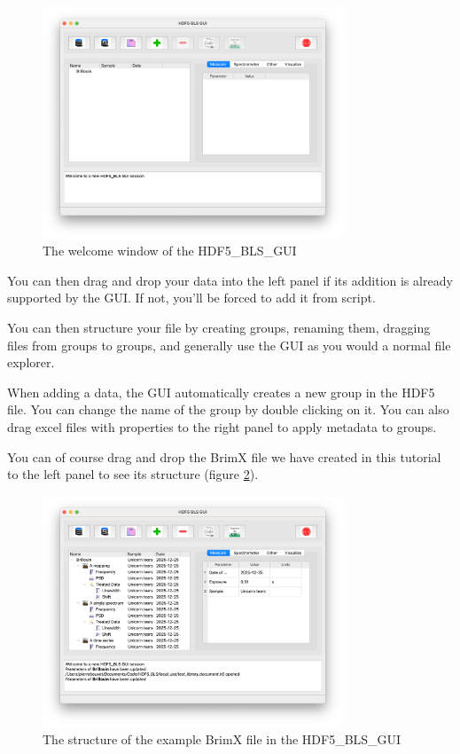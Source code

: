 \documentclass{article}
\begin{document}
\begin{figure}[H]
    \centering
    \includegraphics[width=0.8\textwidth]{img/HDF5_BLS_GUI_welcome.png}
    \caption{The welcome window of the HDF5\_BLS\_GUI}
    \label{fig:gui_main_window}
\end{figure}

You can then drag and drop your data into the left panel if its addition is already supported by the GUI. If not, you'll be forced to add it from script. 

You can then structure your file by creating groups, renaming them, dragging files from groups to groups, and generally use the GUI as you would a normal file explorer.

When adding a data, the GUI automatically creates a new group in the HDF5 file. You can change the name of the group by double clicking on it. You can also drag excel files with properties to the right panel to apply metadata to groups.

You can of course drag and drop the BrimX file we have created in this tutorial to the left panel to see its structure (figure \ref{fig:brimx_structure}).

\begin{figure}[H]
    \centering
    \includegraphics[width=0.8\textwidth]{img/HDF5_BLS_GUI_BrimX_structure.png}
    \caption{The structure of the example BrimX file in the HDF5\_BLS\_GUI}
    \label{fig:brimx_structure}
\end{figure}
\end{document}
